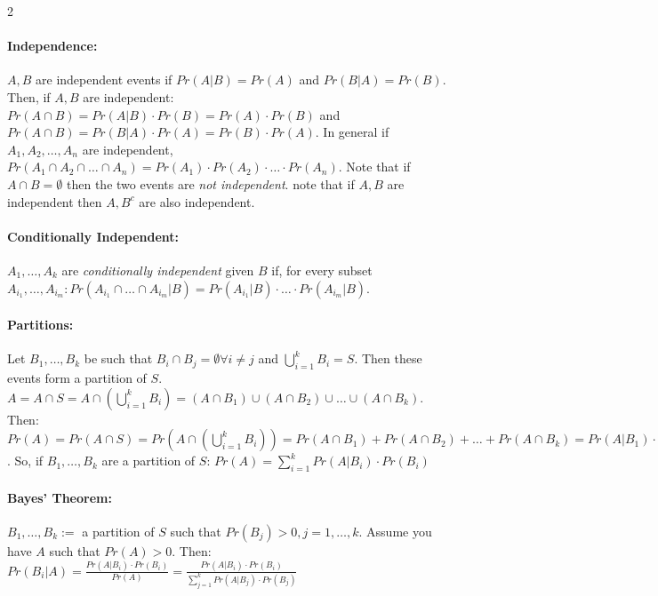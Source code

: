 \documentclass{article}[10pt]
\begin{document}
\begin{multicols}{2}
        \paragraph*{Independence:}
            $A, B$ are independent events if $Pr(A|B) = Pr(A)$ and $Pr(B|A) = Pr(B)$. Then, if $A, B$ are independent: $Pr(A \cap B) = Pr(A|B) \cdot Pr(B) = Pr(A) \cdot Pr(B)$ and $Pr(A \cap B) = Pr(B | A) \cdot Pr(A) = Pr(B) \cdot Pr(A)$. In general if $A_1, A_2, \ldots, A_n$ are independent, $Pr(A_1 \cap A_2 \cap \ldots \cap A_n) = Pr(A_1) \cdot Pr(A_2) \cdot \ldots \cdot Pr(A_n)$. Note that if $A \cap B = \emptyset$ then the two events are \textit{not independent}. note that if $A, B$ are independent then $A, B^c$ are also independent.
        
        \paragraph*{Conditionally Independent: } 
            $A_1, \ldots, A_k$ are \textit{conditionally independent} given $B$ if, for every subset $A_{i_1}, \ldots, A_{i_m}: Pr(A_{i_1} \cap \ldots \cap A_{i_m} | B) = Pr(A_{i_1} | B) \cdot \ldots \cdot Pr(A_{i_m} | B)$.
        
        \paragraph*{Partitions: }
            Let $B_1, \ldots, B_k$ be such that $B_i \cap B_j = \emptyset \forall i \neq j$ and $\bigcup\limits_{i = 1}^{k} B_i = S$. Then these events form a partition of $S$. \\
            $A = A \cap S = A \cap \left(\bigcup\limits_{i = 1}^{k} B_i\right) = (A \cap B_1) \cup (A \cap B_2) \cup \ldots \cup (A \cap B_k)$. Then: $Pr(A) = Pr(A \cap S) = Pr(A \cap \left(\bigcup\limits_{i = 1}^{k} B_i \right)) = Pr(A \cap B_1) + Pr(A \cap B_2) + \ldots + Pr(A \cap B_k) = Pr(A|B_1) \cdot Pr(B_1) + Pr(A|B_2)\cdot Pr(B_2) + \ldots + Pr(A|B_k) \cdot Pr(B_k) = \sum\limits_{i=1}^{k} Pr(A|B_i)\cdot Pr(B_i)$. So, if $B_1, \ldots, B_k$ are a partition of $S$: $Pr(A) = \sum\limits_{i=1}^{k}Pr(A|B_i)\cdot Pr(B_i)$
        
        \paragraph*{Bayes' Theorem:}
            $B_1, \ldots, B_k :=$ a partition of $S$ such that $Pr(B_j) > 0, j = 1, \ldots, k$. Assume you have $A$ such that $Pr(A) > 0$. Then: $Pr(B_i|A) = \frac{Pr(A|B_i) \cdot Pr(B_i)}{Pr(A)} = \frac{Pr(A|B_i) \cdot Pr(B_i)}{\sum\limits_{j=1}^{k}Pr(A|B_j) \cdot Pr(B_j)}$
        

\end{multicols}
\end{document}
